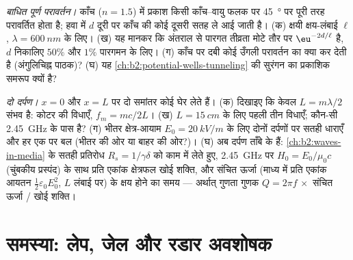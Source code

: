 \begin{exercise}[$\star\star\star$]\label{exo:b2:wave-interfaces:11}
\emph{बाधित पूर्ण परावर्तन।} काँच ($n = 1.5$) में प्रकाश किसी
काँच--वायु फलक पर \qty{45}{\degree} पर पूरी तरह परावर्तित होता है; हवा में
$d$ दूरी पर काँच की कोई दूसरी सतह ले आई जाती है। (क) क्षयी क्षय-लंबाई
$\ell$, $\lambda = \qty{600}{nm}$ के लिए। (ख) यह मानकर कि अंतराल से पारगत
तीव्रता मोटे तौर पर $\eu^{-2d/\ell}$ है, $d$ निकालिए $50\%$
और $1\%$ पारगमन के लिए। (ग) काँच पर दबी कोई उँगली परावर्तन का क्या
कर देती है (अंगुलिचिह्न पाठक)? (घ) यह
\cref{ch:b2:potential-wells-tunneling} की सुरंगन का प्रकाशिक
समरूप क्यों है?
\end{exercise}

\begin{exercise}[$\star\star\star$]\label{exo:b2:wave-interfaces:12}
\emph{दो दर्पण।} $x = 0$ और $x =
L$ पर दो समांतर  कोई  घेर लेते हैं। (क) दिखाइए कि केवल $L = m\lambda/2$ संभव है:
कोटर की विधाएँ, $f_m = mc/2L$। (ख) $L = \qty{15}{cm}$ के लिए पहली
तीन विधाएँ; कौन-सी \qty{2.45}{GHz} के पास है? (ग) भीतर क्षेत्र-आयाम
$E_0 = \qty{20}{kV/m}$ के लिए दोनों दर्पणों पर सतही धाराएँ और हर एक पर बल
(भीतर की ओर या बाहर की ओर?)। (घ) अब दर्पण ताँबे के हैं:
\cref{ch:b2:waves-in-media} के सतही प्रतिरोध $R_s = 1/\gamma\delta$ को काम
में लेते हुए, \qty{2.45}{GHz} पर $H_0 = E_0/\mu_0c$ (चुंबकीय प्रस्पंद) के साथ प्रति एकांक क्षेत्रफल खोई शक्ति, और संचित ऊर्जा
(माध्य में प्रति एकांक आयतन $\tfrac12\varepsilon_0E_0^2$, $L$ लंबाई पर) के
क्षय होने का समय --- अर्थात् गुणता गुणक $Q = 2\pi f\,\times$ संचित ऊर्जा / खोई शक्ति।
\end{exercise}

\section{समस्या: लेप, जेल और रडार अवशोषक}

